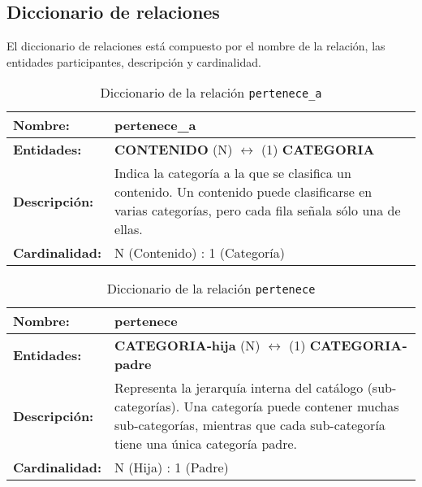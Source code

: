 \subsection{Diccionario de relaciones}

El diccionario de relaciones está compuesto por el nombre de la relación, las entidades participantes, descripción y cardinalidad. 

\renewcommand{\arraystretch}{1.3}

\begin{longtable}{|p{3.5cm}|p{10cm}|}
\caption{Diccionario de la relación \texttt{pertenece\_a}}
\label{tab:rel_pertenece_a} \\ \hline
\textbf{Nombre:} & pertenece\_a \\ \hline
\textbf{Entidades:} & \textbf{CONTENIDO} (N) $\longleftrightarrow$ (1) \textbf{CATEGORIA} \\ \hline
\textbf{Descripción:} & Indica la categoría a la que se clasifica un contenido.  
Un contenido puede clasificarse en varias categorías, pero cada fila señala sólo una de ellas. \\ \hline
\textbf{Cardinalidad:} & N (Contenido) : 1 (Categoría) \\ \hline
\end{longtable}

\begin{longtable}{|p{3.5cm}|p{10cm}|}
\caption{Diccionario de la relación \texttt{pertenece}}
\label{tab:rel_pertenece_cat} \\ \hline
\textbf{Nombre:} & pertenece \\ \hline
\textbf{Entidades:} & \textbf{CATEGORIA‐hija} (N) $\longleftrightarrow$ (1) \textbf{CATEGORIA‐padre} \\ \hline
\textbf{Descripción:} & Representa la jerarquía interna del catálogo (sub-categorías).  
Una categoría puede contener muchas sub-categorías, mientras que cada sub-categoría tiene una única categoría padre. \\ \hline
\textbf{Cardinalidad:} & N (Hija) : 1 (Padre) \\ \hline
\end{longtable}

